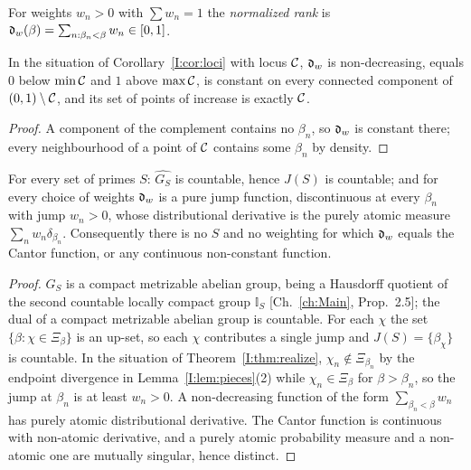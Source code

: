 \begin{definition}\label{I:def:order}
For weights $w_n>0$ with $\sum w_n=1$ the \emph{normalized rank} is
$\mathfrak{d}_w(\beta)=\sum_{n:\beta_n<\beta}w_n\in[0,1]$.
\end{definition}

\begin{theorem}\label{I:thm:staircase}
In the situation of Corollary~\ref{I:cor:loci} with locus $\mathcal{C}$, $\mathfrak{d}_w$ is non-decreasing,
equals $0$ below $\min\mathcal{C}$ and $1$ above $\max\mathcal{C}$, is constant on every connected component
of $(0,1)\setminus\mathcal{C}$, and its set of points of increase is exactly $\mathcal{C}$.
\end{theorem}

\begin{proof}
A component of the complement contains no $\beta_n$, so $\mathfrak{d}_w$ is constant there; every
neighbourhood of a point of $\mathcal{C}$ contains some $\beta_n$ by density.
\end{proof}

\begin{theorem}\label{I:thm:impossible}
For every set of primes $S$: $\widehat{G_S}$ is countable, hence $J(S)$ is countable; and
for every choice of weights $\mathfrak{d}_w$ is a pure jump function, discontinuous at every
$\beta_n$ with jump $w_n>0$, whose distributional derivative is the purely atomic measure
$\sum_nw_n\delta_{\beta_n}$. Consequently there is no $S$ and no weighting for which
$\mathfrak{d}_w$ equals the Cantor function, or any continuous non-constant function.
\end{theorem}

\begin{proof}
$G_S$ is a compact metrizable abelian group, being a Hausdorff quotient of the second
countable locally compact group $\mathbb I_S$ [Ch.~\ref{ch:Main}, Prop.~2.5]; the dual of a compact
metrizable abelian group is countable. For each $\chi$ the set $\{\beta:\chi\in\Xi_\beta\}$ is an up-set, so each $\chi$
contributes a single jump and $J(S)=\{\beta_\chi\}$ is countable. In the situation of
Theorem~\ref{I:thm:realize}, $\chi_n\notin\Xi_{\beta_n}$ by the endpoint divergence in
Lemma~\ref{I:lem:pieces}(2) while $\chi_n\in\Xi_\beta$ for $\beta>\beta_n$, so the jump at
$\beta_n$ is at least $w_n>0$. A non-decreasing function of the form
$\sum_{\beta_n<\beta}w_n$ has purely atomic distributional derivative. The Cantor function
is continuous with non-atomic derivative, and a purely atomic probability measure and a
non-atomic one are mutually singular, hence distinct.
\end{proof}

